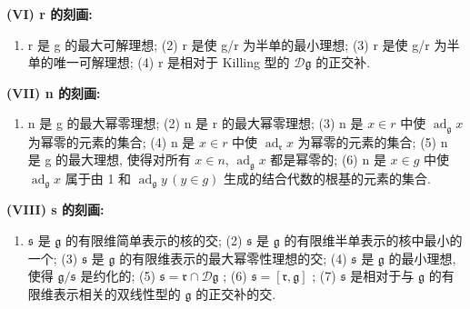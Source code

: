 \textbf{(VI) r 的刻画:}

\begin{enumerate}
\def\labelenumi{(\arabic{enumi})}
\tightlist
\item
  r 是 g 的最大可解理想; (2) r 是使 g/r 为半单的最小理想; (3) r 是使 g/r 为半单的唯一可解理想; (4) r 是相对于 Killing 型的 \(\mathcal{D}\mathfrak{g}\) 的正交补.
\end{enumerate}

\textbf{(VII) n 的刻画:}

\begin{enumerate}
\def\labelenumi{(\arabic{enumi})}
\tightlist
\item
  n 是 g 的最大幂零理想; (2) n 是 r 的最大幂零理想; (3) n 是 \(x \in r\) 中使 \(\operatorname{ad}_{\mathfrak{g}} x\) 为幂零的元素的集合; (4) n 是 \(x \in r\) 中使 \(\operatorname{ad}_{\mathfrak{r}} x\) 为幂零的元素的集合; (5) n 是 g 的最大理想, 使得对所有 \(x \in n\), \(\operatorname{ad}_{\mathfrak{g}} x\) 都是幂零的; (6) n 是 \(x \in g\) 中使 \(\operatorname{ad}_{\mathfrak{g}} x\) 属于由 1 和 \(\operatorname{ad}_{\mathfrak{g}} y\,(y \in g)\) 生成的结合代数的根基的元素的集合.
\end{enumerate}

\textbf{(VIII) s 的刻画:}

\begin{enumerate}
\def\labelenumi{(\arabic{enumi})}
\tightlist
\item
  \(\mathfrak{s}\) 是 \(\mathfrak{g}\) 的有限维简单表示的核的交; (2) \(\mathfrak{s}\) 是 \(\mathfrak{g}\) 的有限维半单表示的核中最小的一个; (3) \(\mathfrak{s}\) 是 \(\mathfrak{g}\) 的有限维表示的最大幂零性理想的交; (4) \(\mathfrak{s}\) 是 \(\mathfrak{g}\) 的最小理想, 使得 \(\mathfrak{g} / \mathfrak{s}\) 是约化的; (5) \(\mathfrak{s} = \mathfrak{r} \cap \mathcal{D}\mathfrak{g}\) ; (6) \(\mathfrak{s} = [\mathfrak{r}, \mathfrak{g}]\) ; (7) \(\mathfrak{s}\) 是相对于与 \(\mathfrak{g}\) 的有限维表示相关的双线性型的 \(\mathfrak{g}\) 的正交补的交.
\end{enumerate}


